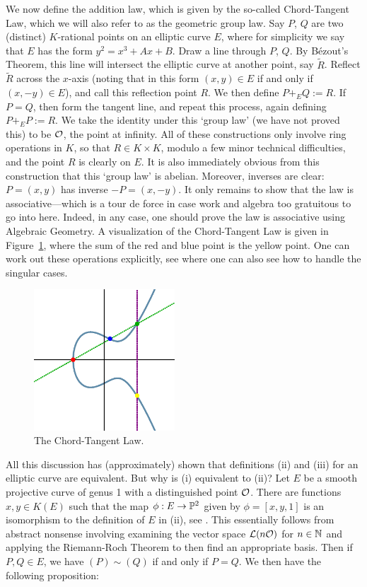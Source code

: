 We now define the addition law, which is given by the so-called Chord-Tangent Law, which we will also refer to as the geometric group law. Say $P$, $Q$ are two (distinct) $K$-rational points on an elliptic curve $E$, where for simplicity we say that $E$ has the form $y^2= x^3 + Ax + B$. Draw a line through $P$, $Q$. By B\'ezout's Theorem, this line will intersect the elliptic curve at another point, say $\widetilde{R}$. Reflect $\widetilde{R}$ across the $x$-axis (noting that in this form $(x,y) \in E$ if and only if $(x,-y) \in E$), and call this reflection point $R$. We then define $P +_E Q:= R$. If $P= Q$, then form the tangent line, and repeat this process, again defining $P +_E P:= R$. We take the identity under this `group law' (we have not proved this) to be $\cO$, the point at infinity. All of these constructions only involve ring operations in $K$, so that $R \in K \times K$, modulo a few minor technical difficulties, and the point $R$ is clearly on $E$. It is also immediately obvious from this construction that this `group law' is abelian. Moreover, inverses are clear: $P= (x,y)$ has inverse $-P= (x,-y)$. It only remains to show that the law is associative---which is a tour de force in case work and algebra too gratuitous to go into here. Indeed, in any case, one should prove the law is associative using Algebraic Geometry. A visualization of the Chord-Tangent Law is given in Figure~\ref{fig:chordtangent}, where the sum of the red and blue point is the yellow point. One can work out these operations explicitly, see \cite[III.2]{silvermanarithmetic} where one can also see how to handle the singular cases. 

	\begin{figure}[!ht]
	\centering
	\includegraphics[width=0.47\textwidth]{images/ec_add.eps}
	\caption{The Chord-Tangent Law.\label{fig:chordtangent}}
	\end{figure}


All this discussion has (approximately) shown that definitions (ii) and (iii) for an elliptic curve are equivalent. But why is (i) equivalent to (ii)? Let $E$ be a smooth projective curve of genus 1 with a distinguished point $\cO$. There are functions $x,y \in K(E)$ such that the map $\phi: E \to \P^2$ given by $\phi= [x, y, 1]$ is an isomorphism to the definition of $E$ in (ii), see \cite[III.3, Prop.~3.1]{silvermanarithmetic}. This essentially follows from abstract nonsense involving examining the vector space $\cL(n\cO)$ for $n \in \N$ and applying the Riemann-Roch Theorem to then find an appropriate basis. Then if $P, Q \in E$, we have $(P) \sim (Q)$ if and only if $P= Q$. We then have the following proposition: 


